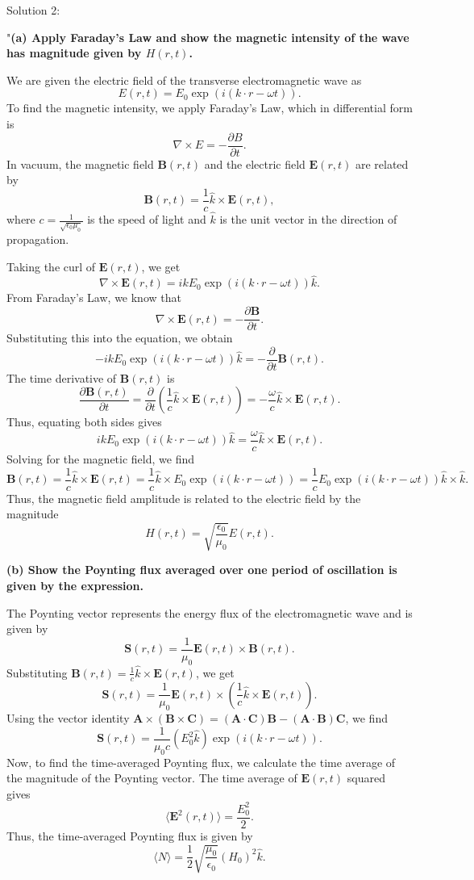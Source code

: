 Solution 2: 

"\textbf{(a) Apply Faraday’s Law and show the magnetic intensity of the wave has magnitude given by \(H(r, t)\).}

We are given the electric field of the transverse electromagnetic wave as
\[
E(r, t) = E_0 \exp(i (k \cdot r - \omega t)).
\]
To find the magnetic intensity, we apply Faraday’s Law, which in differential form is
\[
\nabla \times E = -\frac{\partial B}{\partial t}.
\]
In vacuum, the magnetic field \(\mathbf{B}(r, t)\) and the electric field \(\mathbf{E}(r, t)\) are related by
\[
\mathbf{B}(r, t) = \frac{1}{c} \hat{k} \times \mathbf{E}(r, t),
\]
where \(c = \frac{1}{\sqrt{\epsilon_0 \mu_0}}\) is the speed of light and \(\hat{k}\) is the unit vector in the direction of propagation.

Taking the curl of \(\mathbf{E}(r, t)\), we get
\[
\nabla \times \mathbf{E}(r, t) = i k E_0 \exp(i (k \cdot r - \omega t)) \hat{k}.
\]
From Faraday’s Law, we know that
\[
\nabla \times \mathbf{E}(r, t) = -\frac{\partial \mathbf{B}}{\partial t}.
\]
Substituting this into the equation, we obtain
\[
-i k E_0 \exp(i (k \cdot r - \omega t)) \hat{k} = - \frac{\partial}{\partial t} \mathbf{B}(r, t).
\]
The time derivative of \(\mathbf{B}(r, t)\) is
\[
\frac{\partial \mathbf{B}(r, t)}{\partial t} = \frac{\partial}{\partial t} \left( \frac{1}{c} \hat{k} \times \mathbf{E}(r, t) \right) = -\frac{\omega}{c} \hat{k} \times \mathbf{E}(r, t).
\]
Thus, equating both sides gives
\[
i k E_0 \exp(i (k \cdot r - \omega t)) \hat{k} = \frac{\omega}{c} \hat{k} \times \mathbf{E}(r, t).
\]
Solving for the magnetic field, we find
\[
\mathbf{B}(r, t) = \frac{1}{c} \hat{k} \times \mathbf{E}(r, t) = \frac{1}{c} \hat{k} \times E_0 \exp(i (k \cdot r - \omega t)) = \frac{1}{c} E_0 \exp(i (k \cdot r - \omega t)) \hat{k} \times \hat{k}.
\]
Thus, the magnetic field amplitude is related to the electric field by the magnitude
\[
H(r, t) = \sqrt{\frac{\epsilon_0}{\mu_0}} E(r, t).
\]

\textbf{(b) Show the Poynting flux averaged over one period of oscillation is given by the expression.}

The Poynting vector represents the energy flux of the electromagnetic wave and is given by
\[
\mathbf{S}(r, t) = \frac{1}{\mu_0} \mathbf{E}(r, t) \times \mathbf{B}(r, t).
\]
Substituting \(\mathbf{B}(r, t) = \frac{1}{c} \hat{k} \times \mathbf{E}(r, t)\), we get
\[
\mathbf{S}(r, t) = \frac{1}{\mu_0} \mathbf{E}(r, t) \times \left( \frac{1}{c} \hat{k} \times \mathbf{E}(r, t) \right).
\]
Using the vector identity \(\mathbf{A} \times (\mathbf{B} \times \mathbf{C}) = (\mathbf{A} \cdot \mathbf{C}) \mathbf{B} - (\mathbf{A} \cdot \mathbf{B}) \mathbf{C}\), we find
\[
\mathbf{S}(r, t) = \frac{1}{\mu_0 c} \left( E_0^2 \hat{k} \right) \exp(i (k \cdot r - \omega t)).
\]
Now, to find the time-averaged Poynting flux, we calculate the time average of the magnitude of the Poynting vector. The time average of \( \mathbf{E}(r, t) \) squared gives
\[
\langle \mathbf{E}^2(r, t) \rangle = \frac{E_0^2}{2}.
\]
Thus, the time-averaged Poynting flux is given by
\[
\langle N \rangle = \frac{1}{2} \sqrt{\frac{\mu_0}{\epsilon_0}} (H_0)^2 \hat{k}.
\]

